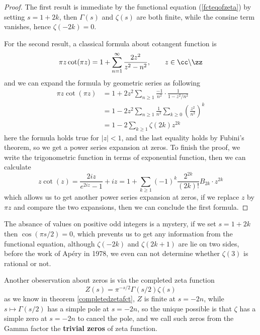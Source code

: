 \begin{proof}
    The first result is immediate by the functional equation (\ref{fcteqofzeta}) by setting \(s = 1+2k\), then \(\Gamma(s)\) and \(\zeta(s)\) are both finite, while the consine term vanishes, hence \(\zeta(-2k) = 0\). 
    
    For the second result, a classical formula about cotangent function is
    \[\pi z \cot(\pi z) = 1 + \sum_{n=1}^\infty \frac{2z^2}{z^2 - n^2}, \qquad z \in \cc \backslash  \zz\]
    and we can expand the formula by geometric series as following
    \begin{align*}
        \pi z \cot(\pi z) &= 1 + 2z^2 \sum_{n\geq 1} \frac{-1}{n^2} \cdot \frac{1}{1 - z^2/n^2} \\
        &= 1 - 2z^2 \sum_{n\geq 1} \frac{1}{n^2} \sum_{k\geq 0} \left(\frac{z^2}{n^2}\right)^k \\
        &= 1 - 2 \sum_{k \geq 1} \zeta(2k) z^{2k}
    \end{align*}
    here the formula holds true for $|z|<1$, and the last equality holds by Fubini's theorem, so we get a power series expansion at zeros. To finish the proof, we write the trigonometric function in terms of exponential function, then we can calculate
    \[z \cot(z) = \frac{2iz}{e^{2iz} - 1} + iz = 1+ \sum_{k \geq 1} (-1)^k \frac{2^{2k}}{(2k)!}B_{2k} \cdot z^{2k}\]
    which allows us to get another power series expansion at zeros, if we replace $z$ by $\pi z$ and compare the two expansions, then we can conclude the first formula.
\end{proof}

\begin{remark}
    The absance of values on positive odd integers is a mystery, if we set \(s = 1+2k\) then \(\cos(\pi s/2)= 0\), which prevents us to get any information from the functional equation, although \(\zeta(-2k)\) and \(\zeta(2k+1)\) are lie on two sides, before the work of Apéry in 1978, we even can not determine whether \(\zeta(3)\) is rational or not.
\end{remark}

\begin{remark}
    Another obeservation about zeros is via the completed zeta function
    \[Z(s) = \pi^{-s/2} \Gamma(s/2) \zeta(s)\]
    as we know in theorem \ref{completedzetafct}, \(Z\) is finite at \(s = -2n\), while \(s \mapsto \Gamma(s/2)\) has a simple pole at \(s = -2n\), so the unique possible is that \(\zeta\) has a simple zero at \(s= -2n\) to cancel the pole, and we call such zeros from the Gamma factor the \textbf{trivial zeros} of zeta function.
\end{remark}

